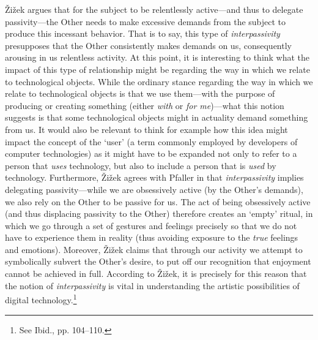 \v{Z}i\v{z}ek argues that for the subject to be relentlessly active---and thus to delegate passivity---the Other needs to make excessive demands from the subject to produce this incessant behavior. That is to say, this type of \emph{interpassivity} presupposes that the Other consistently makes demands on us, consequently arousing in us relentless activity. At this point, it is interesting to think what the impact of this type of relationship might be regarding the way in which we relate to technological objects. While the ordinary stance regarding the way in which we relate to technological objects is that we use them---with the purpose of producing or creating something (either \emph{with} or \emph{for me})---what this notion suggests is that some technological objects might in actuality demand something from us. It would also be relevant to think for example how this idea might impact the concept of the `user' (a term commonly employed by developers of computer technologies) as it might have to be expanded not only to refer to a person that \emph{uses} technology, but also to include a person that is \emph{used} by technology. Furthermore, \v{Z}i\v{z}ek agrees with Pfaller in that \emph{interpassivity} implies delegating passivity---while we are obsessively active (by the Other's demands), we also rely on the Other to be passive for us. The act of being obsessively active (and thus displacing passivity to the Other) therefore creates an `empty' ritual, in which we go through a set of gestures and feelings precisely so that we do not have to experience them in reality (thus avoiding exposure to the \emph{true} feelings and emotions). Moreover, \v{Z}i\v{z}ek claims that through our activity we attempt to symbolically subvert the Other's desire, to put off our recognition that enjoyment cannot be achieved in full. According to \v{Z}i\v{z}ek, it is precisely for this reason that the notion of \emph{interpassivity} is vital in understanding the artistic possibilities of digital technology.\footnote{See Ibid., pp. 104--110.}

